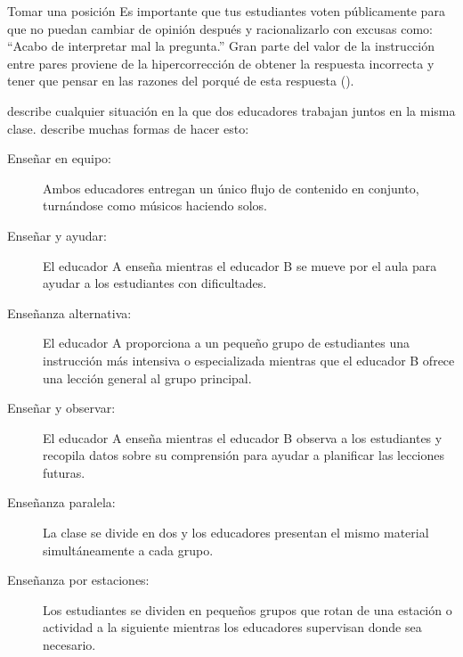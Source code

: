 \newpage
\begin{aside}{Tomar una posición}
  Es importante que tus estudiantes voten públicamente
  para que no puedan cambiar de opinión después y racionalizarlo
  con excusas como: ``Acabo de interpretar mal la pregunta.''
  Gran parte del valor de la instrucción entre pares proviene de la hipercorrección
  de obtener la respuesta incorrecta
  y tener que pensar en las razones del porqué de esta respuesta
  ().
\end{aside}


 describe cualquier situación
en la que dos educadores trabajan juntos en la misma clase.
\cite{Frie2016} describe muchas formas de hacer esto:

\begin{description}

\item[Enseñar en equipo:]
  Ambos educadores entregan un único flujo de contenido en conjunto,
  turnándose como músicos haciendo solos.

\item[Enseñar y ayudar:]
  El educador A enseña mientras el educador B se mueve por el aula
  para ayudar a los estudiantes con dificultades.

\item[Enseñanza alternativa:]
  El educador A proporciona a un pequeño grupo de estudiantes
  una instrucción más intensiva o especializada
  mientras que el educador B ofrece una lección general al grupo principal.
 
\item[Enseñar y observar:]
  El educador A enseña mientras el educador B observa a los estudiantes
  y recopila datos sobre su comprensión para ayudar a planificar las lecciones futuras.

\item[Enseñanza paralela:]
  La clase se divide en dos
  y los educadores presentan el mismo material simultáneamente a cada grupo.

\item[Enseñanza por estaciones:]
  Los estudiantes se dividen en pequeños grupos
  que rotan de una estación o actividad a la siguiente
  mientras los educadores supervisan donde sea necesario.

\end{description}

